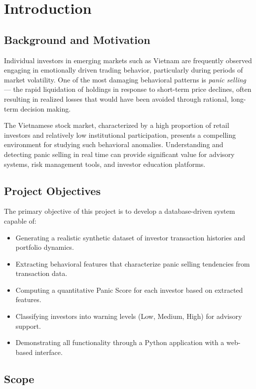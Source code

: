 \chapter{Introduction}

\section{Background and Motivation}

Individual investors in emerging markets such as Vietnam are frequently observed engaging in emotionally driven trading behavior, particularly during periods of market volatility. One of the most damaging behavioral patterns is \textit{panic selling} — the rapid liquidation of holdings in response to short-term price declines, often resulting in realized losses that would have been avoided through rational, long-term decision making.

The Vietnamese stock market, characterized by a high proportion of retail investors and relatively low institutional participation, presents a compelling environment for studying such behavioral anomalies. Understanding and detecting panic selling in real time can provide significant value for advisory systems, risk management tools, and investor education platforms.

\section{Project Objectives}

The primary objective of this project is to develop a database-driven system capable of:

\begin{itemize}
    \item Generating a realistic synthetic dataset of investor transaction histories and portfolio dynamics.
    \item Extracting behavioral features that characterize panic selling tendencies from transaction data.
    \item Computing a quantitative Panic Score for each investor based on extracted features.
    \item Classifying investors into warning levels (Low, Medium, High) for advisory support.
    \item Demonstrating all functionality through a Python application with a web-based interface.
\end{itemize}

\section{Scope}


